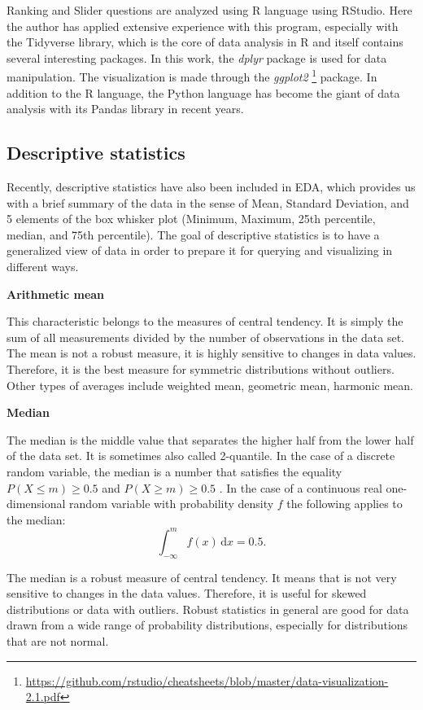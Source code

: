 \documentclass[a4paper,10pt,twoside]{article}
\begin{document}
Ranking and Slider questions are analyzed using R language using RStudio. Here the author has applied extensive experience with this program, especially with the Tidyverse library, which is the core of data analysis in R and itself contains several interesting packages. In this work, the \textit{dplyr} package is used for data manipulation. The visualization is made through the \textit{ggplot2} \footnote{\url{https://github.com/rstudio/cheatsheets/blob/master/data-visualization-2.1.pdf}} package. In addition to the R language, the Python language has become the giant of data analysis with its Pandas library in recent years.

\subsection{Descriptive statistics}

Recently, descriptive statistics have also been included in EDA, which provides us with a brief summary of the data in the sense of Mean, Standard Deviation, and 5 elements of the box whisker plot (Minimum, Maximum, 25th percentile, median, and 75th percentile). The goal of descriptive statistics is to have a generalized view of data in order to prepare it for querying and visualizing in different ways.

\smallskip
\noindent \textbf{Arithmetic mean}
\smallskip

\noindent This characteristic belongs to the measures of central tendency. It is simply the sum of all measurements divided by the number of observations in the data set. The mean is not a robust measure, it is highly sensitive to changes in data values. Therefore, it is the best measure for symmetric distributions without outliers. Other types of averages include weighted mean, geometric mean, harmonic mean.

\smallskip
\noindent \textbf{Median}
\smallskip

\noindent The median is the middle value that separates the higher half from the lower half of the data set. It is sometimes also called 2-quantile. In the case of a discrete random variable, the median is a number that satisfies the equality $ P(X \leq m) \geq 0.5$ and $P(X \geq m) \geq 0.5$ . In the case of a continuous real one-dimensional random variable with probability density $f$ the following applies to the median:
$$
\int_{-\infty}^{m} f(x)\, \mathrm{d}x = 0.5.
$$

\noindent The median is a robust measure of central tendency. It means that is not very sensitive to changes in the data values. Therefore, it is useful for skewed distributions or data with outliers. Robust statistics in general are good for data drawn from a wide range of probability distributions, especially for distributions that are not normal.
\end{document}
